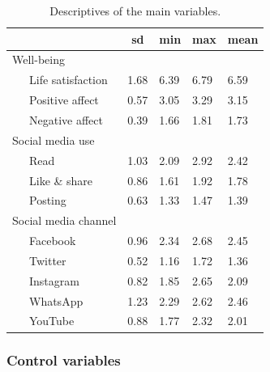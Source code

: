 \documentclass[
  english,
  man,mask,floatsintext]{apa6}
\begin{document}
\begin{table}[tbp]

\begin{center}
\begin{threeparttable}

\caption{\label{tab:descriptives}Descriptives of the main variables.}

\begin{tabular}{lllll}
\toprule
 & \multicolumn{1}{c}{sd} & \multicolumn{1}{c}{min} & \multicolumn{1}{c}{max} & \multicolumn{1}{c}{mean}\\
\midrule
Well-being &  &  &  & \\
\ \ \ Life satisfaction & 1.68 & 6.39 & 6.79 & 6.59\\
\ \ \ Positive affect & 0.57 & 3.05 & 3.29 & 3.15\\
\ \ \ Negative affect & 0.39 & 1.66 & 1.81 & 1.73\\
Social media use &  &  &  & \\
\ \ \ Read & 1.03 & 2.09 & 2.92 & 2.42\\
\ \ \ Like \& share & 0.86 & 1.61 & 1.92 & 1.78\\
\ \ \ Posting & 0.63 & 1.33 & 1.47 & 1.39\\
Social media channel &  &  &  & \\
\ \ \ Facebook & 0.96 & 2.34 & 2.68 & 2.45\\
\ \ \ Twitter & 0.52 & 1.16 & 1.72 & 1.36\\
\ \ \ Instagram & 0.82 & 1.85 & 2.65 & 2.09\\
\ \ \ WhatsApp & 1.23 & 2.29 & 2.62 & 2.46\\
\ \ \ YouTube & 0.88 & 1.77 & 2.32 & 2.01\\
\bottomrule
\end{tabular}

\end{threeparttable}
\end{center}

\end{table}

\hypertarget{control-variables}{%
\subsubsection{Control variables}\label{control-variables}}
\end{document}
